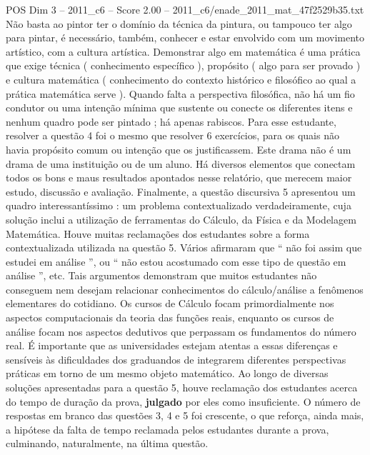 \begin{textsample}{POS Dim 3 – 2011\_c6 – Score 2.00 – 2011\_c6/enade\_2011\_mat\_47f2529b35.txt}
Não basta ao pintor ter o domínio da técnica da pintura, ou tampouco ter algo para pintar, é necessário, também, conhecer e estar envolvido com um movimento artístico, com a cultura artística.
Demonstrar algo em matemática é uma prática que exige técnica ( conhecimento específico ), propósito ( algo para ser provado ) e cultura matemática ( conhecimento do contexto histórico e filosófico ao qual a prática matemática serve ).
Quando falta a perspectiva filosófica, não há um fio condutor ou uma intenção mínima que sustente ou conecte os diferentes itens e nenhum quadro pode ser pintado ; há apenas rabiscos.
Para esse estudante, resolver a questão 4 foi o mesmo que resolver 6 exercícios, para os quais não havia propósito comum ou intenção que os justificassem.
Este drama não é um drama de uma instituição ou de um aluno.
Há diversos elementos que conectam todos os bons e maus resultados apontados nesse relatório, que merecem maior estudo, discussão e avaliação.
Finalmente, a questão discursiva 5 apresentou um quadro interessantíssimo : um problema contextualizado verdadeiramente, cuja solução inclui a utilização de ferramentas do Cálculo, da Física e da Modelagem Matemática.
Houve muitas reclamações dos estudantes sobre a forma contextualizada utilizada na questão 5.
Vários afirmaram que “ não foi assim que estudei em análise ”, ou “ não estou acostumado com esse tipo de questão em análise ”, etc.
Tais argumentos demonstram que muitos estudantes não conseguem nem desejam relacionar conhecimentos do cálculo/análise a fenômenos elementares do cotidiano.
Os cursos de Cálculo focam primordialmente nos aspectos computacionais da teoria das funções reais, enquanto os cursos de análise focam nos aspectos dedutivos que perpassam os fundamentos do número real.
É importante que as universidades estejam atentas a essas diferenças e sensíveis às dificuldades dos graduandos de integrarem diferentes perspectivas práticas em torno de um mesmo objeto matemático.
Ao longo de diversas soluções apresentadas para a questão 5, houve reclamação dos estudantes acerca do tempo de duração da prova, \textbf{julgado} por eles como insuficiente.
O número de respostas em branco das questões 3, 4 e 5 foi crescente, o que reforça, ainda mais, a hipótese da falta de tempo reclamada pelos estudantes durante a prova, culminando, naturalmente, na última questão.

\end{textsample}
